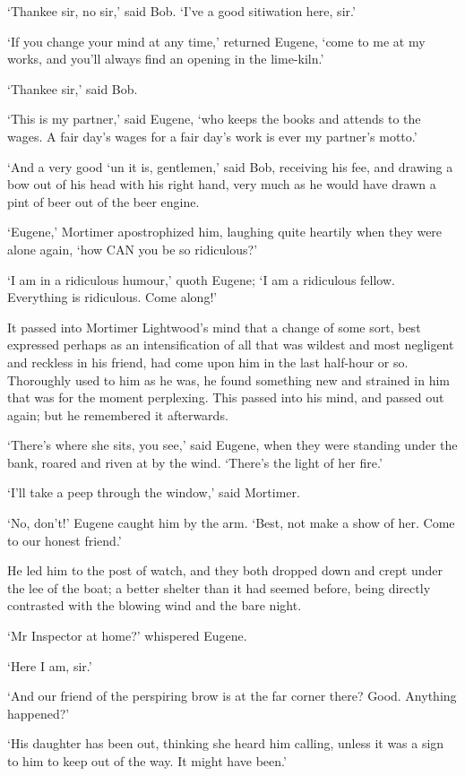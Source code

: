 ‘Thankee sir, no sir,’ said Bob. ‘I’ve a good sitiwation here, sir.’

‘If you change your mind at any time,’ returned Eugene, ‘come to me at
my works, and you’ll always find an opening in the lime-kiln.’

‘Thankee sir,’ said Bob.

‘This is my partner,’ said Eugene, ‘who keeps the books and attends to
the wages. A fair day’s wages for a fair day’s work is ever my partner’s
motto.’

‘And a very good ‘un it is, gentlemen,’ said Bob, receiving his fee, and
drawing a bow out of his head with his right hand, very much as he would
have drawn a pint of beer out of the beer engine.

‘Eugene,’ Mortimer apostrophized him, laughing quite heartily when they
were alone again, ‘how CAN you be so ridiculous?’

‘I am in a ridiculous humour,’ quoth Eugene; ‘I am a ridiculous fellow.
Everything is ridiculous. Come along!’

It passed into Mortimer Lightwood’s mind that a change of some sort,
best expressed perhaps as an intensification of all that was wildest and
most negligent and reckless in his friend, had come upon him in the last
half-hour or so. Thoroughly used to him as he was, he found something
new and strained in him that was for the moment perplexing. This passed
into his mind, and passed out again; but he remembered it afterwards.

‘There’s where she sits, you see,’ said Eugene, when they were standing
under the bank, roared and riven at by the wind. ‘There’s the light of
her fire.’

‘I’ll take a peep through the window,’ said Mortimer.

‘No, don’t!’ Eugene caught him by the arm. ‘Best, not make a show of
her. Come to our honest friend.’

He led him to the post of watch, and they both dropped down and crept
under the lee of the boat; a better shelter than it had seemed before,
being directly contrasted with the blowing wind and the bare night.

‘Mr Inspector at home?’ whispered Eugene.

‘Here I am, sir.’

‘And our friend of the perspiring brow is at the far corner there? Good.
Anything happened?’

‘His daughter has been out, thinking she heard him calling, unless it
was a sign to him to keep out of the way. It might have been.’

